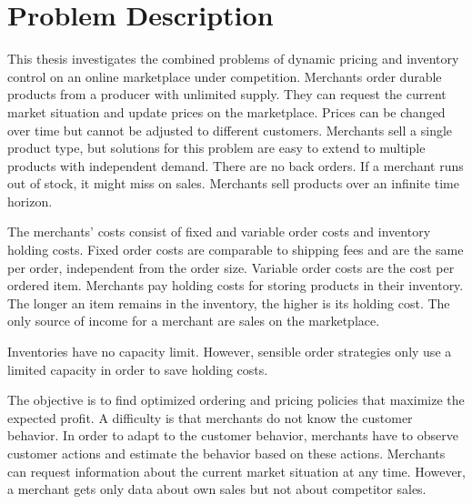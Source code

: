 
\chapter{Problem Description}
\label{chapter:problem}
This thesis investigates the combined problems of dynamic pricing and inventory control on an online marketplace under competition.
Merchants order durable products from a producer with unlimited supply. 
They can request the current market situation and update prices on the marketplace.
Prices can be changed over time but cannot be adjusted to different customers.
Merchants sell a single product type, but solutions for this problem are easy to extend to multiple products with independent demand.
There are no back orders. If a merchant runs out of stock, it might miss on sales.
Merchants sell products over an infinite time horizon.

The merchants' costs consist of fixed and variable order costs and inventory holding costs.
Fixed order costs are comparable to shipping fees and are the same per order, independent from the order size.
Variable order costs are the cost per ordered item.
Merchants pay holding costs for storing products in their inventory.
The longer an item remains in the inventory, the higher is its holding cost. 
The only source of income for a merchant are sales on the marketplace.

Inventories have no capacity limit.
However, sensible order strategies only use a limited capacity in order to save holding costs.

The objective is to find optimized ordering and pricing policies that maximize the expected profit.
A difficulty is that merchants do not know the customer behavior.
In order to adapt to the customer behavior, merchants have to observe customer actions and estimate the behavior based on these actions.
Merchants can request information about the current market situation at any time.
However, a merchant gets only data about own sales but not about competitor sales.
